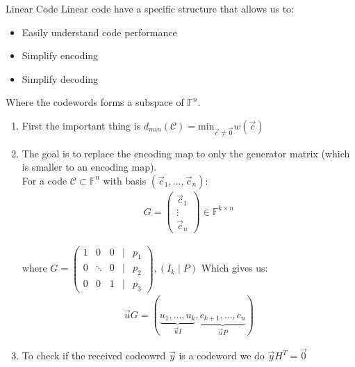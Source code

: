 \begin{parag}{Linear Code}
    Linear code have a specific structure that allows us to:
    \begin{itemize}
        \item Easily understand code performance
        \item Simplify encoding
        \item Simplify decoding
    \end{itemize}
    Where the codewords forms a subspace of $\mathbb{F}^n$.\\
    \begin{enumerate}
        \item First the important thing is $d_{min}\left(\mathcal{C}\right) =  \text{min}_{\vec{c} \neq \vec{0}} w\left(\vec{c}\right)$ 
        \item The goal is to replace the  encoding map to only the generator matrix (which is smaller to an encoding map). \\
            For a code $\mathcal{C} \subset \mathbb{F}^n$ with basis $\left(\vec{c}_1, \ldots, \vec{c}_n\right)$:
            \begin{align*} G = \begin{pmatrix} \vec{c}_1 \\ \vdots \\ \vec{c}_n  \end{pmatrix} \in \mathbb{F}^{k \times n} \end{align*}

            where $G = \begin{pmatrix} 1 & 0 & 0 & \mid & p_1 \\ 0 & \ddots & 0 & \mid & p_2 \\ 0 & 0 & 1 & \mid & p_3 \end{pmatrix} , \left(I_k \mid P\right)$  Which gives us:
            \begin{align*} \vec{u}G = \left( \underbrace{u_1, \ldots, u_k}_{\vec{u}I}, \underbrace{ c_{k+1}, \ldots, c_n}_{\vec{u}P}\right)\end{align*}
        \item To check if the received codeowrd $\vec{y} $ is a codeword we do $\vec{y}H^T =  \vec{0}$
    \end{enumerate}

    
    
\end{parag}



